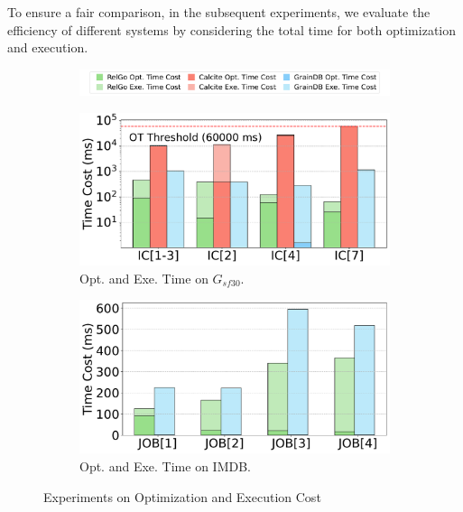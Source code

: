 {To ensure a fair comparison, in the subsequent experiments, we evaluate the efficiency of different systems by considering the total time for both optimization and execution.
}

\begin{figure}[ht]
    \centering
    \begin{subfigure}[b]{\linewidth}
        \centering
        \includegraphics[width=\linewidth]{./figures/exp/opt_exe_legends.pdf}
        \label{fig:exp-opt-legends}
        \vspace*{-2ex}
    \end{subfigure}
    \begin{subfigure}[b]{0.48\linewidth}
        \centering
        \includegraphics[width=\linewidth]{./figures/exp/opt_exe_ldbc.pdf}
        \caption{Opt. and Exe. Time on $G_{sf30}$.}
        \label{fig:exp-opt-ldbc}
    \end{subfigure}
    \begin{subfigure}[b]{0.48\linewidth}
        \centering
        \includegraphics[width=\linewidth]{./figures/exp/opt_exe_job.pdf}
        \caption{Opt. and Exe. Time on IMDB.}
        \label{fig:exp-opt-job}
    \end{subfigure}
    \caption{Experiments on Optimization and Execution Cost}
    \label{fig:exp-optimization}
\end{figure}

